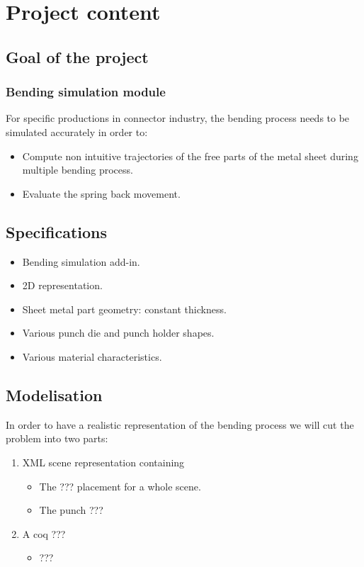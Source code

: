 \documentclass{beamer}
\begin{document}
\section{Project content}
\subsection{Goal of the project}
\begin{frame}
    \frametitle{Bending simulation module}
    For specific productions in connector industry, the bending process needs to be simulated accurately in order to:
    \begin{itemize}
        \item Compute non intuitive trajectories of the free parts of the metal sheet during multiple bending process.
        \item Evaluate the spring back movement.
    \end{itemize}
\end{frame}
\subsection{Specifications}
\begin{frame}
    \begin{itemize}
        \item Bending simulation add-in.
        \item 2D representation.
        \item Sheet metal part geometry: constant thickness.
        \item Various punch die and punch holder shapes.
        \item Various material characteristics.
    \end{itemize}
\end{frame}
\subsection{Modelisation}
\begin{frame}
    In order to have a realistic representation of the bending process we will cut the problem into two parts:
    \begin{enumerate}
        \item XML scene representation containing
            \begin{itemize}
                \item The ??? placement for a whole scene.
                \item The punch ???
            \end{itemize}
        \item A coq ???
            \begin{itemize}
                    \item ???
                \end{itemize}
        \end{enumerate}
\end{frame}
\end{document}
